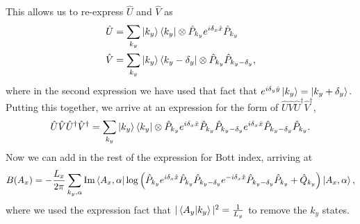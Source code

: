 This allows us to re-express $\hat U$ and $\hat V$ as
\begin{align}
	\hat U &= \sum_{k_y} \ket{k_y} \bra{k_y} \otimes \hat P_{k_y}  e^{i \delta_x \hat x}  \hat P_{k_y}  \\ 
	\hat V &=  \sum_{k_y} \ket{k_y} \bra{k_y - \delta_y} \otimes \hat P_{k_y} \hat P_{k_y - \delta_y},
\end{align}
where in the second expression we have used that fact that $  e^{i \delta_y \hat y}\ket{k_y} = \ket{ k_y +  \delta_y}$. Putting this together, we arrive at an expression for the form of $\hat U\hat V\hat U^\dag \hat V^\dag$,
\begin{align}
	\hat U\hat V\hat U^\dag \hat V^\dag = \sum_{k_y} \ket{k_y} \bra{k_y} \otimes \hat P_{k_y}  e^{i \delta_x \hat x}  \hat P_{k_y} \hat P_{k_y - \delta_y} e^{i \delta_x \hat x}  \hat P_{k_y - \delta_y} \hat P_{k_y} .
\end{align}
Now we can add in the rest of the expression for Bott index, arriving at
\begin{align} \label{eqn:strip_bott_index}
	B( A_x ) =  -\frac{L_x}{2\pi} \sum_{k_y , \alpha}  \textup{Im} \bra{ A_x , \alpha} \log \left (
	\hat P_{k_y}  e^{i \delta_x \hat x}  \hat P_{k_y} \hat P_{k_y - \delta_y} e^{-i \delta_x \hat x}  \hat P_{k_y - \delta_y} \hat P_{k_y} + \hat Q_{k_y}
	 \right ) \ket{A_x , \alpha},
\end{align}
where we used the expression fact that $|\braket{A_y | k_y }|^2 = \frac{1}{L_y}$ to remove the $k_y$ states. 

